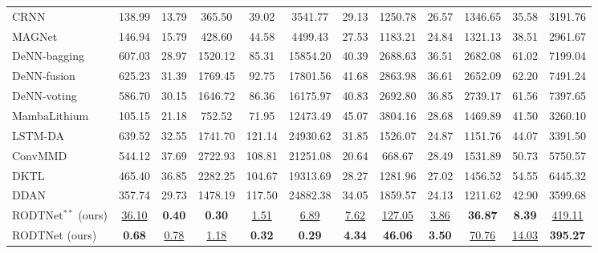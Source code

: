 \documentclass[UTF8,lettersize,journal]{IEEEtran}
\begin{document}
\begin{table}[htbp]
{\begin{adjustbox}{center}
{\begin{threeparttable}
\begin{tabular}{lccccccccccc}
        CRNN \cite{D2EE01676A}  & 138.99  & 13.79  & 365.50  & 39.02  & 3541.77  & 29.13  & 1250.78  & 26.57  & 1346.65  & 35.58  & 3191.76  \\
        MAGNet \cite{TAN2024103725} & 146.94  & 15.79  & 428.60  & 44.58  & 4499.43  & 27.53  & 1183.21  & 24.84  & 1321.13  & 38.51  & 2961.67  \\
        DeNN-bagging \cite{10102497} & 607.03  & 28.97  & 1520.12  & 85.31  & 15854.20  & 40.39  & 2688.63  & 36.51  & 2682.08  & 61.02  & 7199.04  \\
        DeNN-fusion \cite{10102497} & 625.23  & 31.39  & 1769.45  & 92.75  & 17801.56  & 41.68  & 2863.98  & 36.61  & 2652.09  & 62.20  & 7491.24  \\
        DeNN-voting \cite{10102497} & 586.70  & 30.15  & 1646.72  & 86.36  & 16175.97  & 40.83  & 2692.80  & 36.85  & 2739.17  & 61.56  & 7397.65  \\
        MambaLithium \cite{shi2024mambalithiumselectivestatespace} & 105.15  & 21.18  & 752.52  & 71.95  & 12473.49  & 45.07  & 3804.16  & 28.68  & 1469.89  & 41.50  & 3260.10  \\
        LSTM-DA \cite{HAN2022230823} & 639.52  & 32.55  & 1741.70  & 121.14  & 24930.62  & 31.85  & 1526.07  & 24.87  & 1151.76  & 44.07  & 3391.50  \\
        ConvMMD \cite{9788003} & 544.12  & 37.69  & 2722.93  & 108.81  & 21251.08  & 20.64  & 668.67  & 28.49  & 1531.89  & 50.73  & 5750.57  \\
        DKTL \cite{10029904}  & 465.40  & 36.85  & 2282.25  & 104.67  & 19313.69  & 28.27  & 1281.96  & 27.02  & 1456.52  & 54.55  & 6445.32  \\
        DDAN \cite{9560040}  & 357.74  & 29.73  & 1478.19  & 117.50  & 24882.38  & 34.05  & 1859.57  & 24.13  & 1211.62  & 42.90  & 3599.68  \\
        RODTNet$^{\ast\ast}$ {(ours)} & \underline{36.10}  & \textbf{0.40} & \textbf{0.30} & \underline{1.51}  & \underline{6.89}  & \underline{7.62}  & \underline{127.05}  & \underline{3.86}  & \textbf{36.87} & \textbf{8.39} & \underline{419.11}  \\
        RODTNet (ours) & \textbf{0.68} & \underline{0.78}  & \underline{1.18}  & \textbf{0.32} & \textbf{0.29} & \textbf{4.34} & \textbf{46.06} & \textbf{3.50} & \underline{70.76}  & \underline{14.03}  & \textbf{395.27} \\
        \bottomrule
        \end{tabular}%
    \begin{tablenotes}

\end{tablenotes}
\end{threeparttable}}
\end{adjustbox}}
\end{table}
\end{document}
